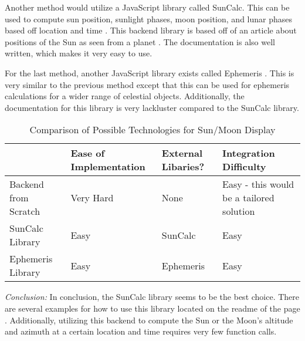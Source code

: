 \documentclass[10pt, onecolumn, draftclsnofoot, letterpaper, compsoc]{IEEEtran}
\begin{document}
Another method would utilize a JavaScript library called SunCalc. This can be
used to compute sun position, sunlight phases, moon position, and lunar phases
based off location and time \cite{SunCalc}. This backend library is based off
of an article about positions of the Sun as seen from a planet \cite{AST}.
The documentation is also well written, which makes it very easy to use.

For the last method, another JavaScript library exists called Ephemeris
\cite{Ephem}. This is very similar to the previous method except that this
can be used for ephemeris calculations for a wider range of celestial objects.
Additionally, the documentation for this library is very lackluster compared
to the SunCalc library.

\begin{table}[h]
\centering
\caption{Comparison of Possible Technologies for Sun/Moon Display}
\begin{tabular}{|p{3.15cm}|p{3.15cm}|p{3.15cm}|p{3.15cm}|}
\cline{4-4}

\hline  & Ease of Implementation & External Libaries? & Integration Difficulty
 \\ \hline

Backend from Scratch & Very Hard & None & Easy - this would be a tailored
solution \\ \hline

SunCalc Library & Easy & SunCalc & Easy \\ \hline

Ephemeris Library & Easy & Ephemeris & Easy \\ \hline

\end{tabular}
\label{table:Jake2}
\end{table}

\textit{Conclusion:} In conclusion, the SunCalc library seems to be the best
choice. There are several examples for how to use this library located on
the readme of the page \cite{SunCalc}. Additionally, utilizing this backend to
compute the Sun or the Moon's altitude and azimuth at a certain location
and time requires very few function calls.

\newpage


\end{document}
